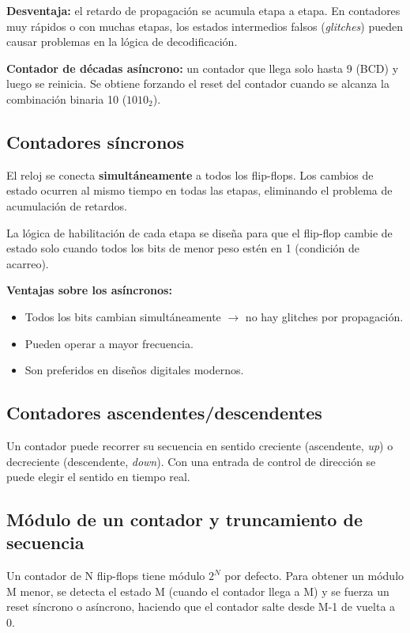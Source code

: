 \textbf{Desventaja:} el retardo de propagación se acumula etapa a etapa. En contadores muy rápidos o con muchas etapas, los estados intermedios falsos (\textit{glitches}) pueden causar problemas en la lógica de decodificación.

\textbf{Contador de décadas asíncrono:} un contador que llega solo hasta 9 (BCD) y luego se reinicia. Se obtiene forzando el reset del contador cuando se alcanza la combinación binaria 10 ($1010_2$).

\subsection{Contadores síncronos}

El reloj se conecta \textbf{simultáneamente} a todos los flip-flops. Los cambios de estado ocurren al mismo tiempo en todas las etapas, eliminando el problema de acumulación de retardos.


La lógica de habilitación de cada etapa se diseña para que el flip-flop cambie de estado solo cuando todos los bits de menor peso estén en 1 (condición de acarreo).

\textbf{Ventajas sobre los asíncronos:}
\begin{itemize}
    \item Todos los bits cambian simultáneamente $\rightarrow$ no hay glitches por propagación.
    \item Pueden operar a mayor frecuencia.
    \item Son preferidos en diseños digitales modernos.
\end{itemize}

\subsection{Contadores ascendentes/descendentes}

Un contador puede recorrer su secuencia en sentido creciente (ascendente, \textit{up}) o decreciente (descendente, \textit{down}). Con una entrada de control de dirección se puede elegir el sentido en tiempo real.

\subsection{Módulo de un contador y truncamiento de secuencia}

Un contador de N flip-flops tiene módulo $2^N$ por defecto. Para obtener un módulo M menor, se detecta el estado M (cuando el contador llega a M) y se fuerza un reset síncrono o asíncrono, haciendo que el contador salte desde M-1 de vuelta a 0.

